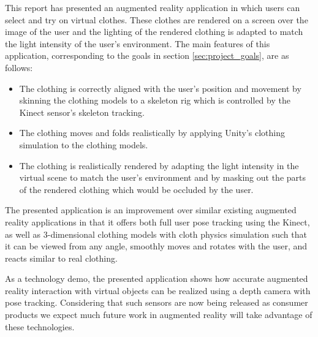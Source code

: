 \documentclass[twocolumn,a4paper]{article}
\begin{document}
This report has presented an augmented reality application in which users can select and try on virtual clothes. These clothes are rendered on a screen over the image of the user and the lighting of the rendered clothing is adapted to match the light intensity of the user's environment. The main features of this application, corresponding to the goals in section \ref{sec:project_goals}, are as follows:
\begin{itemize}
\setlength{\itemsep}{0pt}
  \setlength{\parskip}{0pt}
  \setlength{\parsep}{0pt}
\item The clothing is correctly aligned with the user's position and movement by skinning the clothing models to a skeleton rig which is controlled by the Kinect sensor's skeleton tracking.
\item The clothing moves and folds realistically by applying Unity's clothing simulation to the clothing models.
\item The clothing is realistically rendered by adapting the light intensity in the virtual scene to match the user's environment and by masking out the parts of the rendered clothing which would be occluded by the user.
\end{itemize}

The presented application is an improvement over similar existing augmented reality applications in that it offers both full user pose tracking using the Kinect, as well as 3-dimensional clothing models with cloth physics simulation such that it can be viewed from any angle, smoothly moves and rotates with the user, and reacts similar to real clothing.

As a technology demo, the presented application shows how accurate augmented reality interaction with virtual objects can be realized using a depth camera with pose tracking. Considering that such sensors are now being released as consumer products we expect much future work in augmented reality will take advantage of these technologies.
\end{document}
